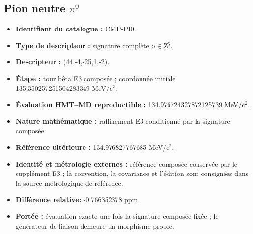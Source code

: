 \subsection{Pion neutre \texorpdfstring{\(\pi^{0}\)}{pi0}}
\begin{itemize}
\item \textbf{Identifiant du catalogue :} CMP-PI0.
\item \textbf{Type de descripteur :} signature complète σ\(\in\)Z\({}^{5}\).
\item \textbf{Descripteur :} (44,-4,-25,1,-2).
\item \textbf{Étape :} tour bêta E3 composée ; coordonnée initiale 135.350257\allowbreak{}251504\allowbreak{}283349 MeV/c\({}^{2}\).
\item \textbf{Évaluation HMT--MD reproductible :} 134.976724\allowbreak{}327872\allowbreak{}125739 MeV/c\({}^{2}\).
\item \textbf{Nature mathématique :} raffinement E3 conditionné par la signature composée.
\item \textbf{Référence ultérieure :} 134.976827\allowbreak{}767685 MeV/c\({}^{2}\).
\item \textbf{Identité et métrologie externes :} référence composée conservée par le supplément E3 ; la convention, la covariance et l’édition sont consignées dans la source métrologique de référence.
\item \textbf{Différence relative:} -0.766352\allowbreak{}378 ppm.
\item \textbf{Portée :} évaluation exacte une fois la signature composée fixée ; le générateur de liaison demeure un morphisme propre.
\end{itemize}
